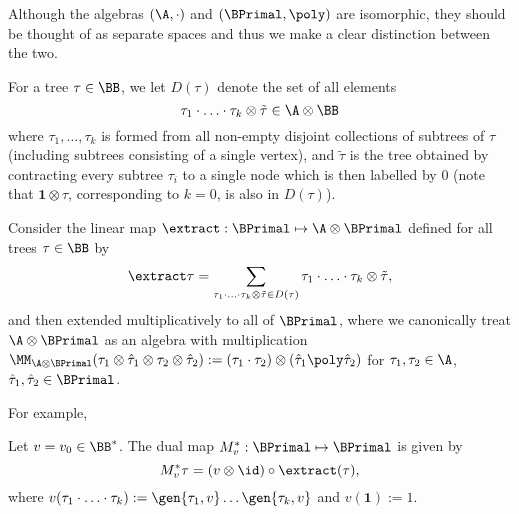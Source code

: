 \documentclass{article}
\begin{document}
\begin{remark}
Although the algebras $(\A,\cdot)$ and $(\BPrimal,\poly)$ are isomorphic, they should be thought of as separate spaces and thus we make a clear distinction between the two.
\end{remark}



For a tree $\tau \in \BB$, we let $D(\tau)$ denote the set of all elements
\[
\tau_1\cdot\ldots \cdot \tau_k \otimes \tilde \tau \in \A \otimes \BB
\]
where $\tau_1,\ldots,\tau_k$ is formed from all non-empty disjoint collections of subtrees of $\tau$ (including subtrees consisting of a single vertex), and $\tilde \tau$ is the tree obtained by contracting every subtree $\tau_i$ to a single node which is then labelled by $0$ (note that $\mathbf{1} \otimes \tau$, corresponding to $k=0$, is also in $D(\tau)$).

Consider the linear map $\extract : \BPrimal \mapsto \A \otimes \BPrimal$ defined for all trees $\tau \in \BB$ by
\[
\extract \tau = \sum_{\tau_1\cdot\ldots\cdot\tau_k \otimes \tilde \tau \in D(\tau)} \tau_1\cdot\ldots\cdot\tau_k \otimes \tilde \tau,
\]
and then extended multiplicatively to all of $\BPrimal$, where we canonically treat $\A\otimes\BPrimal$ as an algebra with multiplication $\MM_{\A\otimes\BPrimal}(\tau_1\otimes\hat{\tau}_1\otimes\tau_2\otimes\hat{\tau}_2):=(\tau_1\cdot\tau_2)\otimes(\hat{\tau}_1\poly\hat{\tau}_2)$ for $\tau_1,\tau_2\in\A$, $\hat{\tau}_1,\hat{\tau}_2\in\BPrimal$.

For example,


\begin{proposition} \label{prop:adjointMv}
Let $v = v_0 \in \BB^*$. The dual map $M_v^* : \BPrimal \mapsto  \BPrimal$ is given by
\[
M_v^* \tau = (v \otimes \id)\circ \extract (\tau),
\]
where $v(\tau_1 \cdot \ldots \cdot \tau_k) := \gen{\tau_1,v}\ldots\gen{\tau_k, v}$ and $v(\mathbf{1}) := 1$.
\end{proposition}
\end{document}
